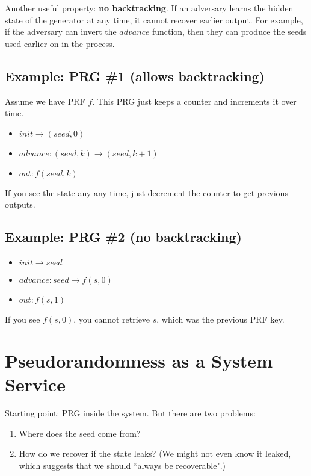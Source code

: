 \documentclass[12pt]{article}
\begin{document}
Another useful property: \textbf{no backtracking}. If an adversary learns the hidden state of the generator at any time, it cannot recover earlier output. For example, if the adversary can invert the $advance$ function, then they can produce the seeds used earlier on in the process.


\subsection*{Example: PRG \#1 (allows backtracking)}

Assume we have PRF $f$. This PRG just keeps a counter and increments it over time.

\begin{itemize}
\item $init \rightarrow (seed, 0)$
\item $advance: (seed, k) \rightarrow (seed, k+1)$
\item $out: f(seed, k)$
\end{itemize}

If you see the state any any time, just decrement the counter to get previous outputs.

\subsection*{Example: PRG \#2 (no backtracking)}

\begin{itemize}
\item $init \rightarrow seed$
\item $advance: seed \rightarrow f(s, 0)$
\item $out: f(s, 1)$
\end{itemize}

If you see $f(s, 0)$, you cannot retrieve $s$, which was the previous PRF key.

\section*{Pseudorandomness as a System Service}

Starting point: PRG inside the system. But there are two problems:
\begin{enumerate}
\item Where does the seed come from?
\item How do we recover if the state leaks? (We might not even know it leaked, which suggests that we should ``always be recoverable".)
\end{enumerate}
\end{document}
